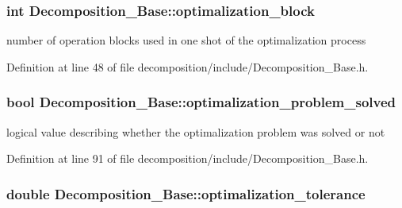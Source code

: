\subsubsection[{\texorpdfstring{optimalization\+\_\+block}{optimalization_block}}]{\setlength{\rightskip}{0pt plus 5cm}int Decomposition\+\_\+\+Base\+::optimalization\+\_\+block}\hypertarget{class_decomposition___base_adae1205825aea9a9544d9ca42855b849}{}\label{class_decomposition___base_adae1205825aea9a9544d9ca42855b849}


number of operation blocks used in one shot of the optimalization process 



Definition at line 48 of file decomposition/include/\+Decomposition\+\_\+\+Base.\+h.

\subsubsection[{\texorpdfstring{optimalization\+\_\+problem\+\_\+solved}{optimalization_problem_solved}}]{\setlength{\rightskip}{0pt plus 5cm}bool Decomposition\+\_\+\+Base\+::optimalization\+\_\+problem\+\_\+solved\hspace{0.3cm}{\ttfamily [protected]}}\hypertarget{class_decomposition___base_ae9c42d3d9cdeeae765d6e7ebc2563d34}{}\label{class_decomposition___base_ae9c42d3d9cdeeae765d6e7ebc2563d34}


logical value describing whether the optimalization problem was solved or not 



Definition at line 91 of file decomposition/include/\+Decomposition\+\_\+\+Base.\+h.

\subsubsection[{\texorpdfstring{optimalization\+\_\+tolerance}{optimalization_tolerance}}]{\setlength{\rightskip}{0pt plus 5cm}double Decomposition\+\_\+\+Base\+::optimalization\+\_\+tolerance}\hypertarget{class_decomposition___base_ae08336b2cdfc58bbd03ba231716f28dd}{}\label{class_decomposition___base_ae08336b2cdfc58bbd03ba231716f28dd}


